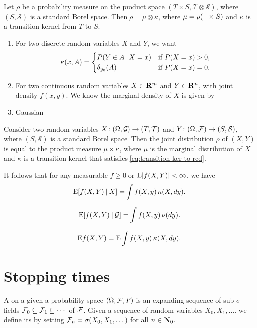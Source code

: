 \begin{thm}
    Let $\rho$ be a probability measure on the product space $(T \times S,\mathcal T \otimes \mathcal S)$, where $(S,\mathcal S)$ is a standard Borel space. Then $\rho = \mu \otimes \kappa$, where $\mu = \rho(\,\cdot\, \times S)$ and $\kappa$ is a transition kernel from $T$ to $S$.
\end{thm}

    \begin{enumerate}
        \item For two discrete random variables $X$ and $Y$, we want \[\kappa(x,A) = \begin{cases}
            P(Y \in A \mathbin{|} X = x) & \text{if } P(X = x) > 0 , \\
            \delta_{y_0}(A) & \text{if } P(X = x) = 0.
        \end{cases}  \]
        \item For two continuous random variables $X \in \mathbf{R}^m$ and $Y \in \mathbf{R}^n$, with joint density $f(x,y)$. We know the marginal density of $X$ is given by 
        \item Gaussian 
    \end{enumerate}

\cite[Theorem~8.5]{Kallenberg_2021}

\begin{namedthm}
    Consider two random variables $X\colon (\Omega, \mathcal{G}) \to (T,\mathcal T)$ and $Y\colon (\Omega,\mathcal{F}) \to (S,\mathcal S)$, where $(S,\mathcal S)$ is a standard Borel space. Then the joint distribution $\rho$ of $(X,Y)$ is equal to the product measure $\mu \times \kappa$, where $\mu$ is the marginal distribution of $X$ and $\kappa$ is a transition kernel that satisfies \eqref{eq:transition-ker-to-rcd}.

    It follows that for any measurable $f \geq 0$ or $\mathop{}\!\mathrm{E} \lvert f(X,Y) \rvert < \infty$, we have 
    \[
        \mathop{}\!\mathrm{E} [f(X,Y)\mathbin{|} X] = \int f(X,y)\,\kappa(X,dy).
    \]
\end{namedthm}
\[
    \mathop{}\!\mathrm{E} [f(X,Y)\mathbin{|} \mathcal{G}] = \int f(X,y)\,\nu(dy).
\]

\[
    \mathop{}\!\mathrm{E} f(X,Y) = \mathop{}\!\mathrm{E} \int f(X,y)\,\kappa(X,dy).
\]


\section{Stopping times}
A  on a given a probability space $(\Omega,\mathcal{F},P)$ is an expanding sequence of sub-$\sigma$-fields $\mathcal{F}_0 \subseteq \mathcal{F}_1\subseteq \dotsb$ of $\mathcal{F}$. Given a sequence of random variables $X_0, X_1, \dotsc$. we define its  by setting $\mathcal{F}_n = \sigma(X_0,X_1,\dotsc)$ for all $n\in \mathbf{N}_0$. 

